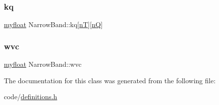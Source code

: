 \mbox{\label{classNarrowBand_a8bc359e07aa76cc711e88b6da8de4cc0}} 
\subsubsection{\texorpdfstring{kq}{kq}}
{\footnotesize\ttfamily \hyperlink{param_8h_a5f097c9f3873af7be7fc156e6a06ca5e}{myfloat} Narrow\+Band\+::kq\mbox{[}\hyperlink{NarrowBand_8h_a11e43991170d325cb21737c8e7d5acaa}{nT}\mbox{]}\mbox{[}\hyperlink{NarrowBand_8h_ac207cb86a4c7e5bc1973837ee2339e59}{nQ}\mbox{]}}

\mbox{\label{classNarrowBand_ac810deacd3afafa848156862a0162d54}} 
\subsubsection{\texorpdfstring{wvc}{wvc}}
{\footnotesize\ttfamily \hyperlink{param_8h_a5f097c9f3873af7be7fc156e6a06ca5e}{myfloat} Narrow\+Band\+::wvc}



The documentation for this class was generated from the following file\+:\begin{DoxyCompactItemize}
\item 
code/\hyperlink{definitions_8h}{definitions.\+h}\end{DoxyCompactItemize}
